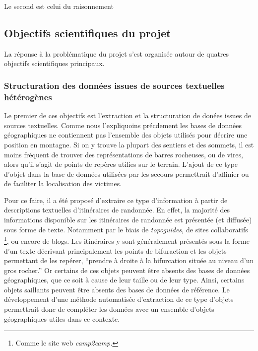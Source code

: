 Le second est celui du raisonnement


\subsection{Objectifs scientifiques du projet}
\label{subsec:1-2-3}

La réponse à la problématique du projet s'est organisée autour de
quatres objectifs scientifiques principaux.

\subsubsection{Structuration des données issues de sources textuelles
  hétérogènes}

Le premier de ces objectifs est l'extraction et la structuration de
donées issues de sources textuelles. Comme nous l'expliquoins
précdement les bases de données géographiques ne contiennent pas
l'ensemble des objets utilisés pour décrire une position en
montagne. Si on y trouve la plupart des sentiers et des sommets, il
est moins fréquent de trouver des représentations de barres rocheuses,
ou de vires, alors qu'il s'agit de points de repères utilies sur le
terrain. L'ajout de ce type d'objet dans la base de données utilisées
par les secours permettrait d'affinier ou de faciliter la localisation
des victimes.

Pour ce faire, il a été proposé d'extraire ce type d'information à
partir de descriptions textuelles d'itinéraires de randonnée. En
effet, la majorité des informations disponible sur les itinéraires de
randonnée est présentée (et diffusée) sous forme de texte. Notamment
par le biais de \emph{topoguides,} de sites collaboratifs
\footnote{Comme le site web \emph{camp2camp.}}, ou encore de
blogs. Les itinéraires y sont généralement présentés sous la forme
d'un texte décrivant principalement les points de bifuraction et les
objets permettant de les repérer, \eg \enquote{prendre à droite à la
  bifurcation située au niveau d'un gros rocher.} Or certains de ces
objets peuvent être absents des bases de données géographiques, que ce
soit à cause de leur taille ou de leur type. Ainsi, certains objets
saillants peuvent être absents des bases de données de référence. Le
développement d'une méthode automatisée d'extraction de ce type
d'objets permettrait donc de compléter les données avec un ensemble
d'objets géographiques utiles dans ce contexte.

